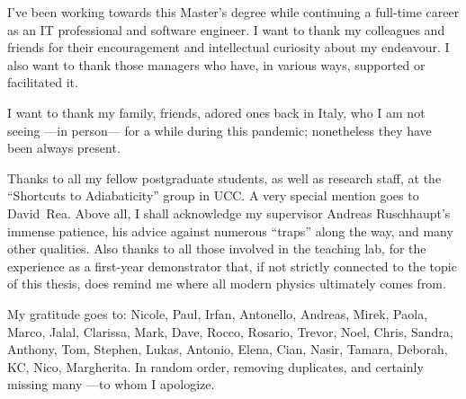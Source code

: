 {

  I've been working towards this Master's degree
  while continuing a full-time career
  as an IT professional and software engineer.
  I want to thank my
  colleagues and friends for their encouragement
  and intellectual curiosity
  about my endeavour.
  I also want to thank those managers
  who have, in various ways, supported or facilitated it.

  I want to thank my family, friends, adored ones back in Italy,
  who I am not seeing ---in person--- for a while during this pandemic;
  nonetheless they have been always present.
  
  Thanks to all my fellow postgraduate students,
  as well as research staff,
  at the ``Shortcuts to Adiabaticity'' group in UCC.
  A very special mention goes to David~Rea.
  Above all, I shall acknowledge my supervisor Andreas Ruschhaupt's immense patience,
  his advice against numerous ``traps'' along the way, and many other qualities.
  Also thanks to all those involved in the teaching lab, for the experience as a
  first-year demonstrator that,
  if not strictly connected to the topic of this thesis,
  does remind me where all modern physics ultimately comes from.

  My gratitude goes to:
  Nicole,
  Paul,
  Irfan,
  Antonello,
  Andreas,
  Mirek,
  Paola,
  Marco,
  Jalal,
  Clarissa,
  Mark,
  Dave,
  Rocco,
  Rosario,
  Trevor,
  Noel,
  Chris,
  Sandra,
  Anthony,
  Tom,
  Stephen,
  Lukas,
  Antonio,
  Elena,
  Cian,
  Nasir,
  Tamara,
  Deborah,
  KC,
  Nico,
  Margherita.
  In random order, removing duplicates, and certainly missing many ---to whom I apologize.
}

